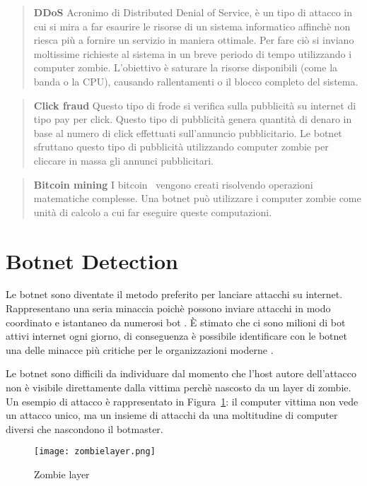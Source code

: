 \documentclass[../main.tex]{subfiles}
\begin{document}
\begin{verse}
				\textbf{DDoS} Acronimo di Distributed Denial of Service, è un tipo di attacco in cui si mira a far esaurire le risorse di un sistema informatico affinchè non riesca più a fornire un servizio in maniera ottimale. Per fare ciò si inviano moltissime richieste al sistema in un breve periodo di tempo utilizzando i computer zombie. L'obiettivo è saturare la risorse disponibili (come la banda o la CPU), causando rallentamenti o il blocco completo del sistema.
\end{verse}

\begin{verse}
				\textbf{Click fraud} Questo tipo di frode si verifica sulla pubblicità su internet di tipo pay per click. Questo tipo di pubblicità genera quantità di denaro in base al numero di click effettuati sull'annuncio pubblicitario. Le botnet sfruttano questo tipo di pubblicità utilizzando computer zombie per cliccare in massa gli annunci pubblicitari.
\end{verse}

\begin{verse}
				\textbf{Bitcoin mining} I bitcoin~\cite{bitcoindef} vengono creati risolvendo operazioni matematiche complesse. Una botnet può utilizzare i computer zombie come unità di calcolo a cui far eseguire queste computazioni.
\end{verse}

\section{Botnet Detection}
Le botnet sono diventate il metodo preferito per lanciare attacchi su internet. Rappresentano una seria minaccia poichè possono inviare attacchi in modo coordinato e istantaneo da numerosi bot \cite{botnetdetection}. È stimato che ci sono milioni di bot attivi internet ogni giorno, di conseguenza è possibile identificare con le botnet una delle minacce più critiche per le organizzazioni moderne \cite{botnetdetection}.

Le botnet sono difficili da individuare dal momento che l'host autore dell'attacco non è visibile direttamente dalla vittima perchè nascosto da un layer di zombie. Un esempio di attacco è rappresentato in Figura~\ref{fig:zombieLayer}: il computer vittima non vede un attacco unico, ma un insieme di attacchi da una moltitudine di computer diversi che nascondono il botmaster.

\begin{figure}[H]
				\centering
				\texttt{[image: zombielayer.png]}
				\caption{Zombie layer}
				\label{fig:zombieLayer}
\end{figure}
\end{document}
